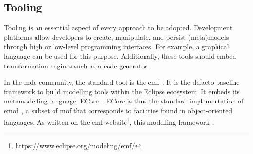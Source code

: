 
\subsection{Tooling}
Tooling is an essential aspect of every approach to be adopted.
Development platforms allow developers to create, manipulate, and persist (meta)\glspl{model} through high or low-level programming interfaces.
For example, a graphical language can be used for this purpose.
Additionally, these tools should embed transformation engines such as a code generator.

In the \gls{mde} community, the standard tool is the \gls{emf}~\cite{steinberg2008emf}.
It is the defacto baseline framework to build modelling tools within the Eclipse ecosystem.
It embeds its metamodelling  language, ECore~\cite{steinberg2008emf, ECore:website}.
ECore is thus the standard implementation of \gls{emof}~\cite{MOF:Spec}, a subset of \gls{mof} that corresponds to facilities found in object-oriented languages.
As written on the \gls{emf}-website\footnote{\url{https://www.eclipse.org/modeling/emf/}}, this modelling framework . 

